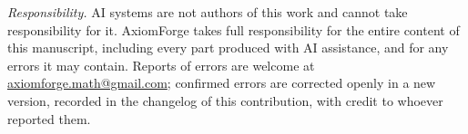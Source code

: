\emph{Responsibility.} AI systems are not authors of this work and cannot take responsibility
for it. AxiomForge takes full responsibility for the entire content of this manuscript,
including every part produced with AI assistance, and for any errors it may contain. Reports
of errors are welcome at \href{mailto:axiomforge.math@gmail.com}{axiomforge.math@gmail.com};
confirmed errors are corrected openly in a new version, recorded in the changelog of this
contribution, with credit to whoever reported them.
